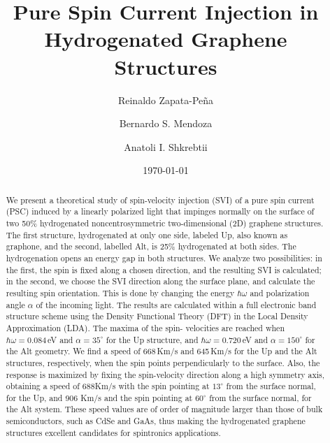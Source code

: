 \documentclass[floatfix,prb,aps,superscriptaddress,showpacs,11pt,preprint,letterpaper]{revtex4}
\begin{document}
\title{Pure Spin Current Injection in Hydrogenated Graphene Structures}
\author{Reinaldo Zapata-Pe\~na}
\author{Bernardo S. Mendoza}
\author{Anatoli I. Shkrebtii}

\date{\today}

\begin{abstract}
We present a theoretical study of spin-velocity injection (SVI) of a pure spin
current (PSC) induced by  a linearly polarized light that impinges normally on
the surface of  two 50\% hydrogenated noncentrosymmetric two-dimensional (2D)
graphene structures. The first structure, hydrogenated at only one side,
labeled Up, also known as graphone, and the second, labelled Alt, is 25\%
hydrogenated at both sides. The hydrogenation opens an energy gap in both
structures. We analyze two possibilities: in the first, the spin is fixed along
a chosen direction, and the resulting SVI is calculated; in the second, we
choose the SVI direction along the surface plane, and calculate the resulting
spin orientation. This is done by changing the energy $\hbar\omega$ and
polarization angle $\alpha$  of the incoming  light. The results are calculated
within a full electronic band structure scheme using the Density Functional
Theory (DFT) in the Local Density Approximation (LDA). The maxima of the spin-
velocities are reached when $\hbar\omega=0.084$\,eV and $\alpha=35^\circ$ for
the Up structure, and $\hbar\omega=0.720$\,eV and $\alpha=150^\circ$ for the
Alt geometry. We find a speed of 668\,Km/s and 645\,Km/s for the Up and the Alt
structures, respectively, when the spin points perpendicularly to the surface.
Also, the response is maximized by fixing the spin-velocity direction along a
high symmetry  axis, obtaining a speed of 688Km/s with the spin pointing at
$13^\circ$ from the surface normal, for the Up, and 906 Km/s and the spin
pointing at $60^\circ$ from the surface normal, for the Alt system. These speed
values are of order of magnitude larger than those of bulk semiconductors, such
as CdSe and GaAs, thus making the hydrogenated graphene structures excellent
candidates for spintronics applications.
\end{abstract}

\maketitle
\end{document}
